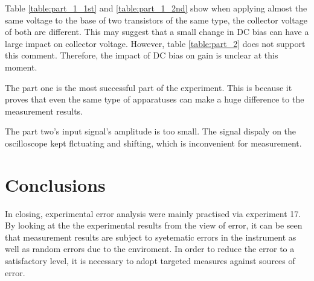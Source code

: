 \documentclass[11pt, a4paper]{article}
\begin{document}
Table \ref{table:part_1_1st} and \ref{table:part_1_2nd} show when applying almost the same voltage to the base of two transistors of the same type, the collector voltage of both are different. This may suggest that a small change in DC bias can have a large impact on collector voltage. However, table \ref{table:part_2} does not support this comment. Therefore, the impact of DC bias on gain is unclear at this moment. 

The part one is the most successful part of the experiment. This is because it proves that even the same type of apparatuses can make a huge difference to the measurement results.

The part two's input signal's amplitude is too small. The signal dispaly on the oscilloscope kept flctuating and shifting, which is inconvenient for measurement.


\section{Conclusions}

In closing, experimental error analysis were mainly practised via experiment 17. By looking at the the experimental results from the view of error, it can be seen that measurement results are subject to syetematic errors in the instrument as well as random errors due to the enviroment. In order to reduce the error to a satisfactory level, it is necessary to adopt targeted measures against sources of error.


  
\end{document}
